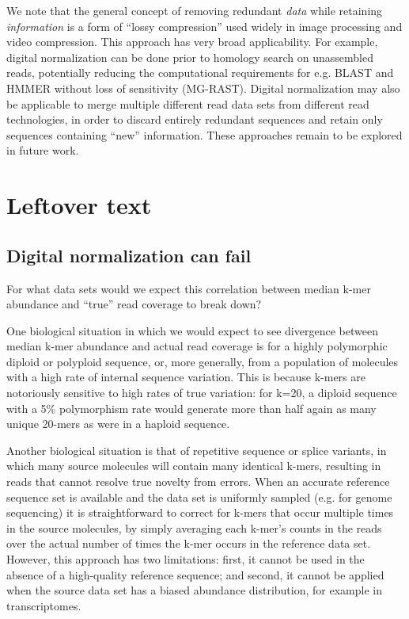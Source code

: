 \documentclass[10pt]{article}
\begin{document}
We note that the general concept of removing redundant {\em data}
while retaining {\em information} is a form of ``lossy compression''
used widely in image processing and video compression.  This approach
has very broad applicability.  For example, digital normalization
can be done prior to homology search on unassembled reads, potentially
reducing the computational requirements for e.g. BLAST and HMMER
without loss of sensitivity (MG-RAST).  Digital normalization may also
be applicable to merge multiple different read data sets from
different read technologies, in order to discard entirely redundant
sequences and retain only sequences containing ``new'' information.
These approaches remain to be explored in future work.

\section*{Leftover text}

\subsection*{Digital normalization can fail}

For what data sets would we expect this correlation between median
k-mer abundance and ``true'' read coverage to break down?

One biological situation in which we would expect to see divergence
between median k-mer abundance and actual read coverage is for a
highly polymorphic diploid or polyploid sequence, or, more generally,
from a population of molecules with a high rate of internal sequence
variation.  This is because k-mers are notoriously sensitive to high
rates of true variation: for k=20, a diploid sequence with a 5\%
polymorphism rate would generate more than half again as many unique
20-mers as were in a haploid sequence.

Another biological situation is that of repetitive sequence or splice
variants, in which many source molecules will contain many identical
k-mers, resulting in reads that cannot resolve true novelty from errors.  When an accurate reference sequence set is available and the
data set is uniformly sampled (e.g. for genome sequencing) it is
straightforward to correct for k-mers that occur multiple times in the
source molecules, by simply averaging each k-mer's counts in the reads
over the actual number of times the k-mer occurs in the reference data
set.  However, this approach has two limitations: first, it cannot be
used in the absence of a high-quality reference sequence; and second,
it cannot be applied when the source data set has a biased abundance
distribution, for example in transcriptomes.
\end{document}
